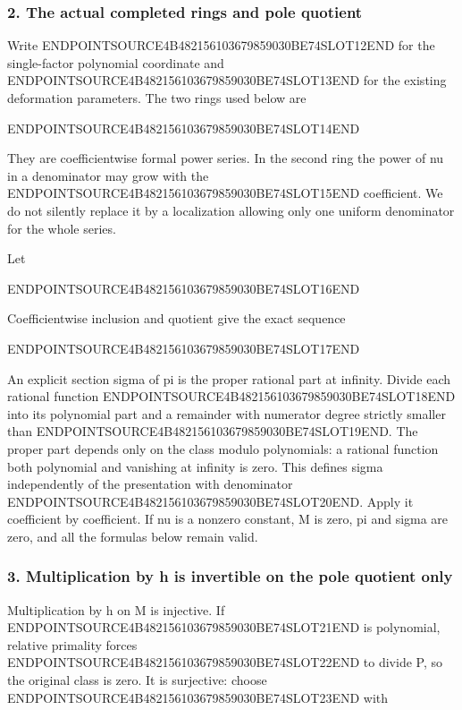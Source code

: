 \subsubsection{2. The actual completed rings and pole quotient}\label{endpoint-f1_unit_gauge--the-actual-completed-rings-and-pole-quotient}

Write ENDPOINTSOURCE4B482156103679859030BE74SLOT12END for the single-factor polynomial coordinate and ENDPOINTSOURCE4B482156103679859030BE74SLOT13END for the existing deformation parameters. The two rings used below are

ENDPOINTSOURCE4B482156103679859030BE74SLOT14END

They are coefficientwise formal power series. In the second ring the power of nu in a denominator may grow with the ENDPOINTSOURCE4B482156103679859030BE74SLOT15END coefficient. We do not silently replace it by a localization allowing only one uniform denominator for the whole series.

Let

ENDPOINTSOURCE4B482156103679859030BE74SLOT16END

Coefficientwise inclusion and quotient give the exact sequence

ENDPOINTSOURCE4B482156103679859030BE74SLOT17END

An explicit section sigma of pi is the proper rational part at infinity. Divide each rational function ENDPOINTSOURCE4B482156103679859030BE74SLOT18END into its polynomial part and a remainder with numerator degree strictly smaller than ENDPOINTSOURCE4B482156103679859030BE74SLOT19END. The proper part depends only on the class modulo polynomials: a rational function both polynomial and vanishing at infinity is zero. This defines sigma independently of the presentation with denominator ENDPOINTSOURCE4B482156103679859030BE74SLOT20END. Apply it coefficient by coefficient. If nu is a nonzero constant, M is zero, pi and sigma are zero, and all the formulas below remain valid.

\subsubsection{3. Multiplication by h is invertible on the pole quotient only}\label{endpoint-f1_unit_gauge--multiplication-by-h-is-invertible-on-the-pole-quotient-only}

Multiplication by h on M is injective. If ENDPOINTSOURCE4B482156103679859030BE74SLOT21END is polynomial, relative primality forces ENDPOINTSOURCE4B482156103679859030BE74SLOT22END to divide P, so the original class is zero. It is surjective: choose ENDPOINTSOURCE4B482156103679859030BE74SLOT23END with


